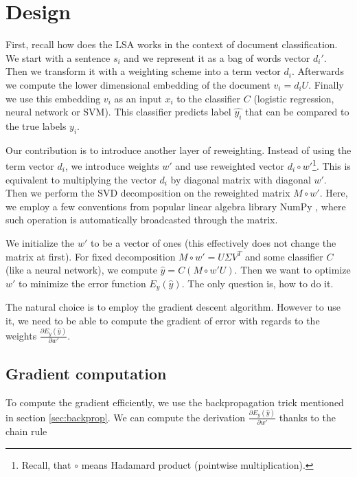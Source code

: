 \section{Design} \label{sec:design}

    First, recall how does the LSA works in the context of document classification.
    We start with a sentence $s_i$ and we represent it as a bag of words vector $d_i'$. 
    Then we transform it with a weighting scheme into a term vector $d_i$.
    Afterwards we compute the lower dimensional embedding of the document $v_i = d_i U$. 
    Finally we use this embedding $v_i$ as an input $x_i$ to the classifier $C$ (logistic regression, neural network or SVM).
    This classifier predicts label $\hat{y_i}$ that can be compared to
    the true labels $y_i$.
    
    Our contribution is to introduce another layer of reweighting. 
    Instead of using the term vector $d_i$, we introduce weights $w'$ and use reweighted vector $d_i \circ w'$\footnote{Recall, that $\circ$ means Hadamard product (pointwise multiplication).}.
    This is equivalent to multiplying the vector $d_i$ by diagonal matrix with diagonal $w'$.
    Then we perform the SVD decomposition on the reweighted matrix $M \circ w'$. 
    Here, we employ a few conventions from popular linear algebra library NumPy \cite{oliphant2006guide}, 
    where such operation is automatically broadcasted through the matrix.
    
    We initialize the $w'$ to be a vector of ones (this effectively does not change the matrix at first).
    For fixed decomposition $M\circ w'= U\Sigma V^T$ and some classifier $C$ (like a neural network),
    we compute $\hat{y} = C(M \circ w' U)$.
    Then we want to optimize $w'$ to minimize the error function $E_y(\hat{y})$.
    The only question is, how to do it.
    
    The natural choice is to employ the gradient descent algorithm. 
    However to use it, we need to be able to compute the gradient of error with regards to the weights $\frac{\partial E_y(\hat{y})}{\partial w'}$.
    
    \subsection{Gradient computation}
    
    To compute the gradient efficiently, we use the backpropagation trick mentioned in section \ref{sec:backprop}.
    We can compute the derivation $\frac{\partial E_y(\hat{y})}{\partial w'}$ thanks to the chain rule
    
